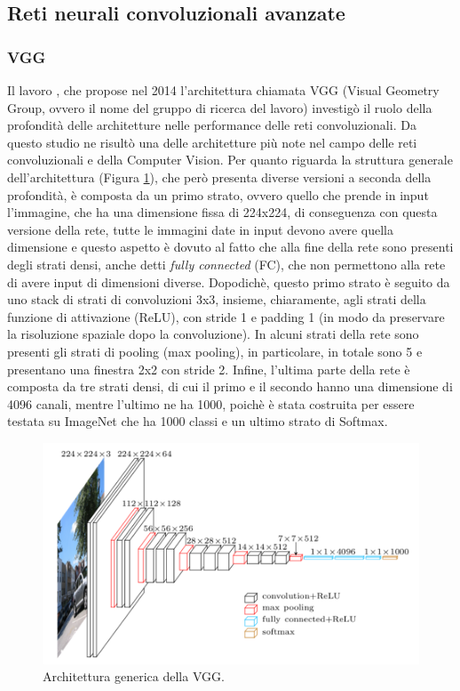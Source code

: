 \subsection{Reti neurali convoluzionali avanzate}

\subsubsection{VGG}
Il lavoro \cite{vgg}, che propose nel 2014 l'architettura chiamata VGG (Visual Geometry Group, ovvero il nome del gruppo di ricerca del lavoro) investigò il ruolo della profondità delle architetture nelle performance delle reti convoluzionali. Da questo studio ne risultò una delle architetture più note nel campo delle reti convoluzionali e della Computer Vision. Per quanto riguarda la struttura generale dell'architettura (Figura \ref{fig:vgg}), che però presenta diverse versioni a seconda della profondità, è composta da un primo strato, ovvero quello che prende in input l'immagine, che ha una dimensione fissa di 224x224, di conseguenza con questa versione della rete, tutte le immagini date in input devono avere quella dimensione e questo aspetto è dovuto al fatto che alla fine della rete sono presenti degli strati densi, anche detti \textit{fully connected} (FC), che non permettono alla rete di avere input di dimensioni diverse. Dopodichè, questo primo strato è seguito da uno stack di strati di convoluzioni 3x3, insieme, chiaramente, agli strati della funzione di attivazione (ReLU), con stride 1 e padding 1 (in modo da preservare la risoluzione spaziale dopo la convoluzione). In alcuni strati della rete sono presenti gli strati di pooling (max pooling), in particolare, in totale sono 5 e presentano una finestra 2x2 con stride 2. Infine, l'ultima parte della rete è composta da tre strati densi, di cui il primo e il secondo hanno una dimensione di 4096 canali, mentre l'ultimo ne ha 1000, poichè è stata costruita per essere testata su ImageNet che ha 1000 classi e un ultimo strato di Softmax.


\begin{figure}[h!]
  \hspace*{0.4in}
  \includegraphics[scale=0.7]{img/vgg.png}
  \caption{Architettura generica della VGG.}
  \label{fig:vgg}
\end{figure}



